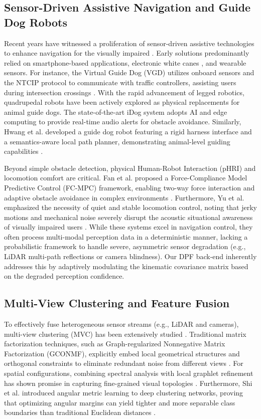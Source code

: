 \documentclass[final,3p,times]{elsarticle}
\begin{document}
\subsection{Sensor-Driven Assistive Navigation and Guide Dog Robots}
Recent years have witnessed a proliferation of sensor-driven assistive technologies to enhance navigation for the visually impaired \cite{patel2024review, wang2026design}. Early solutions predominantly relied on smartphone-based applications, electronic white canes \cite{ye2016co}, and wearable sensors. For instance, the Virtual Guide Dog (VGD) utilizes onboard sensors and the NTCIP protocol to communicate with traffic controllers, assisting users during intersection crossings \cite{zhong2020virtual}. With the rapid advancement of legged robotics, quadrupedal robots have been actively explored as physical replacements for animal guide dogs. The state-of-the-art iDog system \cite{chen2024idog} adopts AI and edge computing to provide real-time audio alerts for obstacle avoidance. Similarly, Hwang et al. developed a guide dog robot featuring a rigid harness interface and a semantics-aware local path planner, demonstrating animal-level guiding capabilities \cite{hwang2022system}. 

Beyond simple obstacle detection, physical Human-Robot Interaction (pHRI) and locomotion comfort are critical. Fan et al. proposed a Force-Compliance Model Predictive Control (FC-MPC) framework, enabling two-way force interaction and adaptive obstacle avoidance in complex environments \cite{fan2024force}. Furthermore, Yu et al. emphasized the necessity of quiet and stable locomotion control, noting that jerky motions and mechanical noise severely disrupt the acoustic situational awareness of visually impaired users \cite{yu2025human}. While these systems excel in navigation control, they often process multi-modal perception data in a deterministic manner, lacking a probabilistic framework to handle severe, asymmetric sensor degradation (e.g., LiDAR multi-path reflections or camera blindness). Our DPF back-end inherently addresses this by adaptively modulating the kinematic covariance matrix based on the degraded perception confidence.

\subsection{Multi-View Clustering and Feature Fusion}
To effectively fuse heterogeneous sensor streams (e.g., LiDAR and cameras), multi-view clustering (MVC) has been extensively studied \cite{wang2024self, chowdhury2025deep, fang2023comprehensive}. Traditional matrix factorization techniques, such as Graph-regularized Nonnegative Matrix Factorization (GCONMF), explicitly embed local geometrical structures and orthogonal constraints to eliminate redundant noise from different views \cite{zhang2018multi}. For spatial configurations, combining spectral analysis with local graphlet refinement has shown promise in capturing fine-grained visual topologies \cite{xu2021multi}. Furthermore, Shi et al. introduced angular metric learning to deep clustering networks, proving that optimizing angular margins can yield tighter and more separable class boundaries than traditional Euclidean distances \cite{shi2023deep}.
\end{document}
